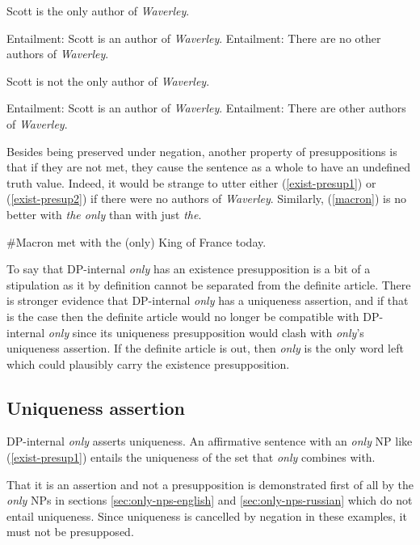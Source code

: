 \begin{exe}
	\ex \label{exist-presup1} Scott is the only author of \textit{Waverley}.
		\begin{xlist}
			\ex Entailment: Scott is an author of \textit{Waverley}.
			\ex Entailment: There are no other authors of \textit{Waverley}.
		\end{xlist}
	\ex \label{exist-presup2} Scott is not the only author of \textit{Waverley}.
		\begin{xlist}
			\ex Entailment: Scott is an author of \textit{Waverley}.
			\ex Entailment: There are other authors of \textit{Waverley}.
		\end{xlist}
\end{exe}

Besides being preserved under negation, another property of presuppositions is that if they are not met, they cause the sentence as a whole to have an undefined truth value. Indeed, it would be strange to utter either (\ref{exist-presup1}) or (\ref{exist-presup2}) if there were no authors of \textit{Waverley}. Similarly, (\ref{macron}) is no better with \textit{the only} than with just \textit{the}.

\begin{exe}
	\ex \label{macron} \#Macron met with the (only) King of France today.
\end{exe}

To say that DP-internal \textit{only} has an existence presupposition is a bit of a stipulation as it by definition cannot be separated from the definite article. There is stronger evidence that DP-internal \textit{only} has a uniqueness assertion, and if that is the case then the definite article would no longer be compatible with DP-internal \textit{only} since its uniqueness presupposition would clash with \textit{only}'s uniqueness assertion. If the definite article is out, then \textit{only} is the only word left which could plausibly carry the existence presupposition.

\subsection{Uniqueness assertion}
DP-internal \textit{only} asserts uniqueness. An affirmative sentence with an \textit{only} NP like (\ref{exist-presup1}) entails the uniqueness of the set that \textit{only} combines with.

That it is an assertion and not a presupposition is demonstrated first of all by the \textit{only} NPs in sections \ref{sec:only-nps-english} and \ref{sec:only-nps-russian} which do not entail uniqueness. Since uniqueness is cancelled by negation in these examples, it must not be presupposed.

